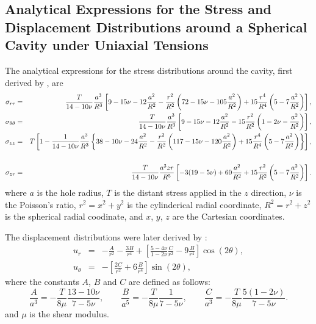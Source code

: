 \documentclass[sn-mathphys,Numbered]{sn-jnl}%
\begin{document}
\begin{appendices}
\section{Analytical Expressions for the Stress and Displacement Distributions around a Spherical Cavity under Uniaxial Tensions}
\label{app:sphericalCavity}
The analytical expressions for the stress distributions around the cavity, first derived by \citet{Southwell1926}, are
\begin{eqnarray}
	\sigma_{rr} &=&
		\frac{T}{14 - 10\nu} \frac{a^3}{R^3}
		\left[ 9 - 15\nu - 12 \frac{a^2}{R^2}  - \frac{r^2}{R^2} \left( 72 - 15\nu - 105 \frac{a^2}{R^2} \right) + 15 \frac{r^4}{R^4} \left( 5 - 7 \frac{a^2}{R^2} \right) \right], \\
	\sigma_{\theta\theta} &=&
		\frac{T}{14 - 10\nu} \frac{a^3}{R^3}
		\left[ 9 - 15\nu - 12 \frac{a^2}{R^2}  - 15 \frac{r^2}{R^2} \left( 1 - 2\nu - \frac{a^2}{R^2} \right) \right], \\
	\sigma_{zz} &=&
		T \left[ 1 - \frac{1}{14 - 10\nu} \frac{a^3}{R^3} \left\{ 38 - 10\nu - 24 \frac{a^2}{R^2} 
		- \frac{r^2}{R^2} \left( 117 - 15\nu - 120 \frac{a^2}{R^2} \right)
		+ 15 \frac{r^4}{R^4} \left( 5 - 7 \frac{a^2}{R^2} \right) \right\} \right], \notag \\
		\\
	\sigma_{zr} &=&
	\frac{T}{14 - 10\nu} \frac{a^3 z r}{R^5}
	\left[ -3(19 - 5\nu) + 60 \frac{a^2}{R^2} + 15 \frac{r^2}{R^2} \left( 5 - 7 \frac{a^2}{R^2} \right)  \right].
\end{eqnarray}
where $a$ is the hole radius, $T$ is the distant stress applied in the $z$ direction, $\nu$ is the Poisson's ratio, $r^2 = x^2 + y^2$ is the cylinderical radial coordinate, $R^2 = r^2 + z^2$ is the spherical radial coodinate, and $x$, $y$, $z$ are the Cartesian coordinates.

The displacement distributions were later derived by \citet{Goodier1933}:
\begin{eqnarray}
u_r &=& -\frac{A}{r^2} - \frac{3B}{r^4} + \left[ \frac{5-4\nu}{1-2\nu} \frac{C}{r^2}-9\frac{B}{r^4} \right]\cos (2\theta),\\
u_{\theta} &=& - \left[ \frac{2C}{r^2} + 6\frac{B}{r^4}  \right]\sin(2\theta),
\end{eqnarray}
where the constants $A$, $B$ and $C$ are defined as follows:
\begin{equation}
\frac{A}{a^3} = -\frac{T}{8\mu}\frac{13-10\nu}{7-5\nu}, \qquad
\frac{B}{a^5} = -\frac{T}{8\mu}\frac{1}{7-5\nu}, \qquad
\frac{C}{a^3} = -\frac{T}{8\mu}\frac{5(1-2\nu)}{7-5\nu}.
\end{equation}
and $\mu$ is the shear modulus.


\end{appendices}


\end{document}
